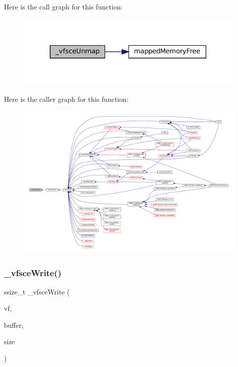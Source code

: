 Here is the call graph for this function\+:
\nopagebreak
\begin{figure}[H]
\begin{center}
\leavevmode
\includegraphics[width=316pt]{sce-vfs_8c_a294309dc9bd8e8bd80780494cb15e4a4_cgraph}
\end{center}
\end{figure}
Here is the caller graph for this function\+:
\nopagebreak
\begin{figure}[H]
\begin{center}
\leavevmode
\includegraphics[width=350pt]{sce-vfs_8c_a294309dc9bd8e8bd80780494cb15e4a4_icgraph}
\end{center}
\end{figure}
\mbox{\label{sce-vfs_8c_a5f802766061345000a7795bb2cc0c0d9}} 
\subsubsection{\texorpdfstring{\+\_\+vfsce\+Write()}{\_vfsceWrite()}}
{\footnotesize\ttfamily ssize\+\_\+t \+\_\+vfsce\+Write (\begin{DoxyParamCaption}\item[{struct V\+File $\ast$}]{vf,  }\item[{const void $\ast$}]{buffer,  }\item[{size\+\_\+t}]{size }\end{DoxyParamCaption})\hspace{0.3cm}{\ttfamily [static]}}

